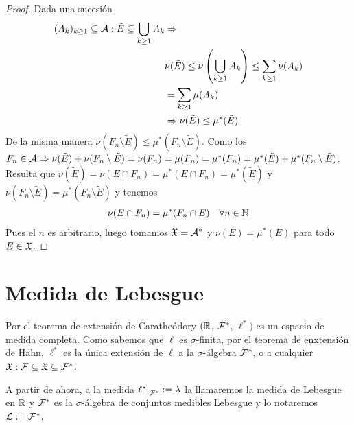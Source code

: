 \begin{theorem}
\begin{proof}
        Dada una sucesión \begin{align*}
            (A_k)_{k \geq 1} \subseteq \mathcal{A} : \tilde{E} \subseteq \bigcup_{k \geq 1} A_k & \Rightarrow                                                                              \\
                                                                                           & \nu(\tilde{E}) \leq \nu\left(\bigcup_{k \geq 1} A_k\right) \leq \sum_{k \geq 1} \nu(A_k) \\
                                                                                           & = \sum_{k \geq 1} \mu(A_k)                                                               \\
                                                                                           & \Rightarrow \nu(\tilde{E}) \leq \mu^*(\tilde{E})
        \end{align*}
        De la misma manera $\nu(F_n \setminus \tilde{E}) \leq \mu^*(F_n \setminus \tilde{E})$.
        Como los $F_n \in \mathcal{A} \Rightarrow \nu(\tilde{E}) + \nu(F_n \setminus \tilde{E}) = \nu(F_n) = \mu(F_n) = \mu^*(F_n) = \mu^*(\tilde{E}) + \mu^*(F_n \setminus \tilde{E})$.
        Resulta que $\nu(\tilde{E}) = \nu(E \cap F_n) = \mu^*(E \cap F_n) = \mu^*(\tilde{E})$ y $\nu(F_n \setminus \tilde{E}) = \mu^*(F_n \setminus \tilde{E})$ y tenemos \begin{align*}
            \nu(E \cap F_n) = \mu^*(F_n \cap E) \quad \forall n \in \mathbb{N}
        \end{align*}
        Pues el $n$ es arbitrario, luego tomamos $\mathfrak{X} = \mathcal{A}^*$ y $\nu(E) = \mu^*(E)$ para todo $E \in \mathfrak{X}$.
    \end{proof}
\end{theorem}

\section{Medida de Lebesgue}

Por el teorema de extensión de Caratheódory $(\mathbb{R}$, $\mathcal{F}^*$, $\ell^*)$ es un espacio de medida completa.
Como sabemos que $\ell$ es $\sigma$-finita, por el teorema de enxtensión de Hahn, $\ell^*$ es la única extensión de $\ell$ a la $\sigma$-álgebra $\mathcal{F}^*$,
o a cualquier $\mathfrak{X} : \mathcal{F} \subseteq \mathfrak{X} \subseteq \mathcal{F}^*$.

A partir de ahora, a la medida $\restr{\ell^*}{\mc{F}^*} := \lambda$ la llamaremos la medida de Lebesgue en $\mathbb{R}$ y $\mathcal{F}^*$ es la $\sigma$-álgebra de conjuntos
medibles Lebesgue y lo notaremos $\mathcal{L} := \mathcal{F}^*$.

